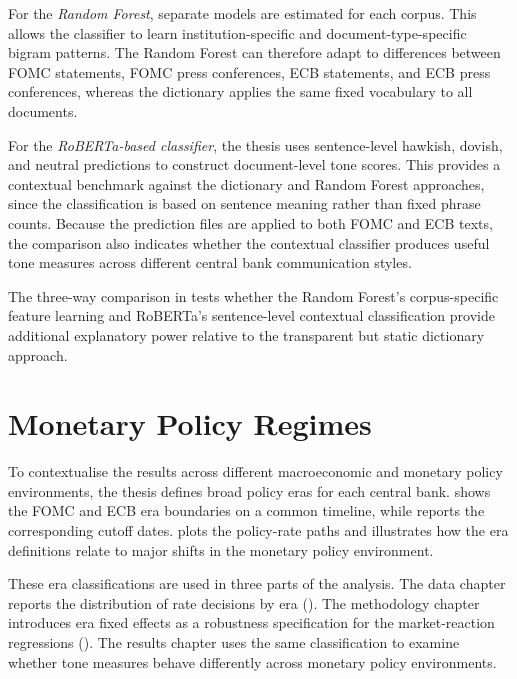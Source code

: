 For the \emph{Random Forest}, separate models are estimated for each
corpus. This allows the classifier to learn institution-specific and
document-type-specific bigram patterns. The Random Forest can therefore
adapt to differences between FOMC statements, FOMC press conferences,
ECB statements, and ECB press conferences, whereas the dictionary applies
the same fixed vocabulary to all documents.

For the \emph{RoBERTa-based classifier}, the thesis uses sentence-level
hawkish, dovish, and neutral predictions to construct document-level tone
scores. This provides a contextual benchmark against the dictionary and
Random Forest approaches, since the classification is based on sentence
meaning rather than fixed phrase counts. Because the prediction files are
applied to both FOMC and ECB texts, the comparison also indicates whether
the contextual classifier produces useful tone measures across different
central bank communication styles.

The three-way comparison in  tests whether the
Random Forest's corpus-specific feature learning and RoBERTa's
sentence-level contextual classification provide additional explanatory
power relative to the transparent but static dictionary approach.


\section{Monetary Policy Regimes}
\label{sec:inst_eras}

To contextualise the results across different macroeconomic and monetary
policy environments, the thesis defines broad policy eras for each
central bank.  shows the FOMC and ECB era
boundaries on a common timeline, while  reports the
corresponding cutoff dates.  plots the policy-rate
paths and illustrates how the era definitions relate to major shifts in
the monetary policy environment.

These era classifications are used in three parts of the analysis. The
data chapter reports the distribution of rate decisions by era
(). The methodology chapter introduces era fixed
effects as a robustness specification for the market-reaction
regressions (). The results chapter uses the same
classification to examine whether tone measures behave differently
across monetary policy environments.

